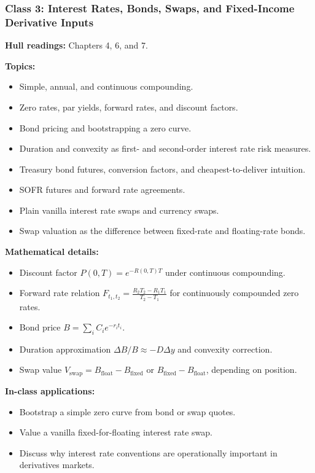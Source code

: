 \documentclass[11pt]{article}
\begin{document}
\subsubsection*{Class 3: Interest Rates, Bonds, Swaps, and Fixed-Income Derivative Inputs}
\textbf{Hull readings:} Chapters 4, 6, and 7.

\textbf{Topics:}
\begin{itemize}
    \item Simple, annual, and continuous compounding.
    \item Zero rates, par yields, forward rates, and discount factors.
    \item Bond pricing and bootstrapping a zero curve.
    \item Duration and convexity as first- and second-order interest rate risk measures.
    \item Treasury bond futures, conversion factors, and cheapest-to-deliver intuition.
    \item SOFR futures and forward rate agreements.
    \item Plain vanilla interest rate swaps and currency swaps.
    \item Swap valuation as the difference between fixed-rate and floating-rate bonds.
\end{itemize}

\textbf{Mathematical details:}
\begin{itemize}
    \item Discount factor $P(0,T)=e^{-R(0,T)T}$ under continuous compounding.
    \item Forward rate relation $F_{t_1,t_2} = \frac{R_2T_2-R_1T_1}{T_2-T_1}$ for continuously compounded zero rates.
    \item Bond price $B=\sum_i C_i e^{-r_i t_i}$.
    \item Duration approximation $\Delta B/B \approx -D\Delta y$ and convexity correction.
    \item Swap value $V_{\text{swap}}=B_{\text{float}}-B_{\text{fixed}}$ or $B_{\text{fixed}}-B_{\text{float}}$, depending on position.
\end{itemize}

\textbf{In-class applications:}
\begin{itemize}
    \item Bootstrap a simple zero curve from bond or swap quotes.
    \item Value a vanilla fixed-for-floating interest rate swap.
    \item Discuss why interest rate conventions are operationally important in derivatives markets.
\end{itemize}
\end{document}
